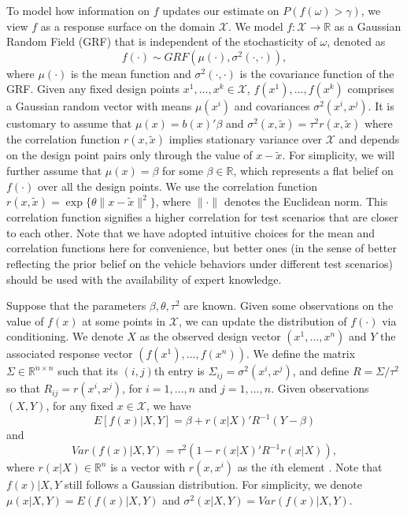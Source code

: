 \documentclass{wscpaperproc}
\theoremstyle{wsc}
\begin{document}
To model how information on $f$ updates our estimate on $P(f(\omega)>\gamma)$, we view $f$ as a response surface on the domain $\mathcal X$. We model $f:\mathcal X\to\mathbb R$ as a Gaussian Random Field (GRF) \cite{rasmussen2006gaussian} that is independent of the stochasticity of $\omega$, denoted as\begin{equation*}
	f(\cdot) \sim GRF(\mu(\cdot),\sigma^2(\cdot,\cdot)),
\end{equation*}
where $\mu(\cdot)$ is the mean function and $\sigma^2(\cdot,\cdot)$ is the covariance function of the GRF. Given any fixed design points $x^1,\ldots,x^k\in \mathcal X$, $f(x^1),\ldots,f(x^k)$ comprises a Gaussian random vector with means $\mu(x^i)$ and covariances $\sigma^2(x^i,x^j)$. It is customary to assume that $\mu(x)=b(x)'\beta$ and $\sigma^2(x,\tilde x)=\tau^2 r(x,\tilde x)$ where the correlation function $r(x,\tilde x)$ implies stationary variance over $\mathcal X$ and depends on the design point pairs only through the value of $x-\tilde x$. For simplicity, we will further assume that $\mu(x)=\beta$ for some $\beta \in \mathbb{R}$, which represents a flat belief on $f(\cdot)$ over all the design points. We use the correlation function $r(x,\tilde x)=\exp\{\theta\|x-\tilde x\|^2\} $, where $\|\cdot\|$ denotes the Euclidean norm. This correlation function signifies a higher correlation for test scenarios that are closer to each other. Note that we have adopted intuitive choices for the mean and correlation functions here for convenience, but better ones (in the sense of better reflecting the prior belief on the vehicle behaviors under different test scenarios) should be used with the availability of expert knowledge.

Suppose that the parameters $\beta, \theta, \tau^2$ are known. Given some observations on the value of $f(x)$ at some points in $\mathcal X$, we can update the distribution of $f(\cdot)$ via conditioning. We denote $X$ as the observed design vector $(x^1,...,x^n)$ and $Y$ the associated response vector $(f(x^1),...,f(x^n))$. We define the matrix $\Sigma\in\mathbb R^{n\times n}$ such that its $(i,j)$th entry is $\Sigma_{ij}=\sigma^2(x^i,x^j)$, and define $R=\Sigma/\tau^2$ so that $R_{ij}=r(x^i,x^j)$, for $i=1,...,n$ and $j=1,...,n$. Given observations $(X,Y)$, for any fixed $x\in\mathcal X$, we have \begin{equation*}
	E[f(x)|X,Y]= \beta +r(x|X)'R^{-1}(Y-\beta)
\end{equation*}
and
\begin{equation*}
	Var(f(x)|X,Y)=\tau^2 (1- r(x|X)'R^{-1}r(x|X)),
\end{equation*}
where $r(x|X)\in\mathbb R^n$ is a vector with $r(x,x^i)$ as the $i$th element \cite{rasmussen2006gaussian}. Note that $f(x)|X,Y$ still follows a Gaussian distribution. For simplicity, we denote $\mu(x|X,Y)=E(f(x)|X,Y)$ and  $\sigma^2(x|X,Y)=Var(f(x)|X,Y)$. 
\end{document}
